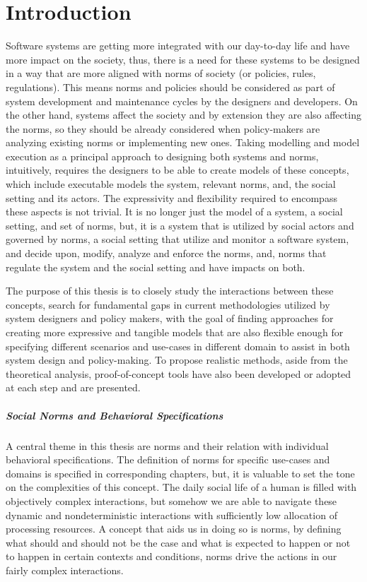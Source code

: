 \chapter{Introduction}
Software systems are getting more integrated with our day-to-day life and have more impact on the society, thus, there is a need for these systems to be designed in a way that are more aligned with norms of society (or policies, rules, regulations). This means norms and policies should be considered as part of system development and maintenance cycles by the designers and developers. On the other hand, systems affect the society and by extension they are also affecting the norms, so they should be already considered when policy-makers are analyzing existing norms or implementing new ones. Taking modelling and model execution as a principal approach to designing both systems and norms, intuitively, requires the designers to be able to create models of these concepts, which include executable models the system, relevant norms, and, the social setting and its actors. The expressivity and flexibility required to encompass these aspects is not trivial. It is no longer just the model of a system, a social setting, and set of norms, but, it is a system that is utilized by social actors and governed by norms, a social setting that utilize and monitor a software system, and decide upon, modify, analyze and enforce the norms, and, norms that regulate the system and the social setting and have impacts on both.


The purpose of this thesis is to closely study the interactions between these concepts, search for fundamental gaps in current methodologies utilized by system designers and policy makers, with the goal of finding approaches for creating more expressive and tangible models that are also flexible enough for specifying different scenarios and use-cases in different domain to assist in both system design and policy-making. To propose realistic methods, aside from the theoretical analysis, proof-of-concept tools have also been developed or adopted at each step and are presented.


\paragraph{Social Norms and Behavioral Specifications}
A central theme in this thesis are norms and their relation with individual behavioral specifications. The definition of norms for specific use-cases and domains is specified in corresponding chapters, but, it is valuable to set the tone on the complexities of this concept. The daily social life of a human is filled with objectively complex interactions, but somehow we are able to navigate these dynamic and nondeterministic interactions with sufficiently low allocation of processing resources. A concept that aids us in doing so is norms, by defining what should and should not be the case and what is expected to happen or not to happen in certain contexts and conditions, norms drive the actions in our fairly complex interactions. 


